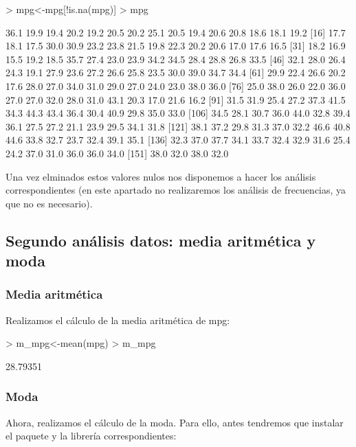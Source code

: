 \documentclass [a4paper] {article}
\begin{document}
\begin{Schunk}
\begin{Sinput}
> mpg<-mpg[!is.na(mpg)]
> mpg
\end{Sinput}
\begin{Soutput}
  [1] 36.1 19.9 19.4 20.2 19.2 20.5 20.2 25.1 20.5 19.4 20.6 20.8 18.6 18.1 19.2
 [16] 17.7 18.1 17.5 30.0 30.9 23.2 23.8 21.5 19.8 22.3 20.2 20.6 17.0 17.6 16.5
 [31] 18.2 16.9 15.5 19.2 18.5 35.7 27.4 23.0 23.9 34.2 34.5 28.4 28.8 26.8 33.5
 [46] 32.1 28.0 26.4 24.3 19.1 27.9 23.6 27.2 26.6 25.8 23.5 30.0 39.0 34.7 34.4
 [61] 29.9 22.4 26.6 20.2 17.6 28.0 27.0 34.0 31.0 29.0 27.0 24.0 23.0 38.0 36.0
 [76] 25.0 38.0 26.0 22.0 36.0 27.0 27.0 32.0 28.0 31.0 43.1 20.3 17.0 21.6 16.2
 [91] 31.5 31.9 25.4 27.2 37.3 41.5 34.3 44.3 43.4 36.4 30.4 40.9 29.8 35.0 33.0
[106] 34.5 28.1 30.7 36.0 44.0 32.8 39.4 36.1 27.5 27.2 21.1 23.9 29.5 34.1 31.8
[121] 38.1 37.2 29.8 31.3 37.0 32.2 46.6 40.8 44.6 33.8 32.7 23.7 32.4 39.1 35.1
[136] 32.3 37.0 37.7 34.1 33.7 32.4 32.9 31.6 25.4 24.2 37.0 31.0 36.0 36.0 34.0
[151] 38.0 32.0 38.0 32.0
\end{Soutput}
\end{Schunk}

Una vez elminados estos valores nulos nos disponemos a hacer los análisis correspondientes (en este apartado no
realizaremos los análisis de frecuencias, ya que no es necesario).

\subsection{Segundo análisis datos: media aritmética y moda }

\subsubsection{Media aritmética}
Realizamos el cálculo de la media aritmética de mpg:

\begin{Schunk}
\begin{Sinput}
> m_mpg<-mean(mpg)
> m_mpg
\end{Sinput}
\begin{Soutput}
[1] 28.79351
\end{Soutput}
\end{Schunk}

\subsubsection{Moda}
Ahora, realizamos el cálculo de la moda. Para ello, antes tendremos que instalar el paquete y la librería
correspondientes:
\end{document}
